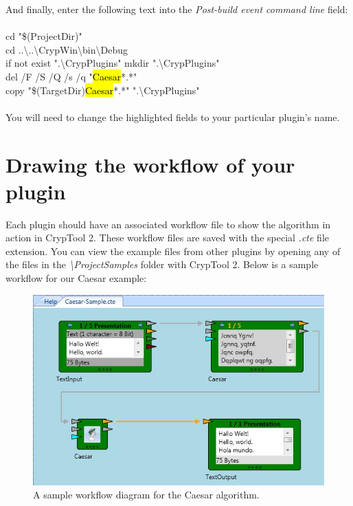 \noindent And finally, enter the following text into the \textit{Post-build event command line} field:\\\\
cd "\$(ProjectDir)" \\
cd ..\textbackslash ..\textbackslash CrypWin\textbackslash bin\textbackslash Debug\\
if not exist ".\textbackslash CrypPlugins" mkdir ".\textbackslash CrypPlugins"\\
del /F /S /Q /s /q "\hl{Caesar}*.*"\\
copy "\$(TargetDir)\hl{Caesar}*.*" ".\textbackslash CrypPlugins"\\\\
You will need to change the highlighted fields to your particular plugin's name.
\clearpage

\section{Drawing the workflow of your plugin}
\label{DrawingTheWorkfloweOfYourPlugin}

Each plugin should have an associated workflow file to show the algorithm in action in CrypTool 2. These workflow files are saved with the special \textit{.cte} file extension. You can view the example files from other plugins by opening any of the files in the \textit{\textbackslash ProjectSamples} folder with CrypTool 2. Below is a sample workflow for our Caesar example:

\begin{figure}[h]
	\centering
		\includegraphics{figures/sample.jpg}
	\caption{A sample workflow diagram for the Caesar algorithm.}
	\label{fig:sample}
\end{figure}

